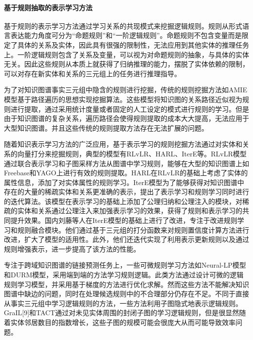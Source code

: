 \paragraph{基于规则抽取的表示学习方法}
基于规则的表示学习方法通过学习关系的共现模式来挖掘逻辑规则。规则从形式语言表达能力角度可分为“命题规则”和“一阶逻辑规则”\cite{2023-ed}。命题规则不包含变量而是限定了具体的关系及实体，因此具有很强的限制性，无法应用到其他实体的推理任务上。一阶逻辑规则包含了关系及变量，可以视为对命题规则的抽象，与具体的实体无关。因此这些规则从本质上就获得了归纳推理的能力，摆脱了实体依赖的限制，可以对存在新实体和关系的三元组上的任务进行推理指导。

为了对知识图谱事实三元组中隐含的规则进行挖掘，传统的规则挖掘方法如AMIE\cite{galarraga2013amie}模型基于路径遍历的思想实现挖掘算法。这些模型将知识图的关系路径近似视为规则进行提取，通过采用统计度量或者固定的人工设定的模式进行规则的学习。但是由于知识图谱的复杂关系，遍历路径会使得规则提取的成本大大提高，无法应用于大型知识图谱。并且这些传统的规则提取方法存在无法扩展的问题。

随着知识表示学习方法的广泛应用，基于表示学习的规则挖掘方法通过对实体和关系的向量打分来挖掘规则，典型的模型有RLvLR\cite{omran2018scalable}、HARL\cite{omran2022learning}、IterE\cite{zhang2019iteratively}等。RLvLR模型通过联合表示学习和子图采样方法从图谱中学习规则，能够在大型的知识图谱上如Freebase和YAGO上进行有效的规则提取。HARL在RLvLR的基础上考虑了实体的属性信息，添加了对实体属性的规则学习。IterE模型为了能够获得对知识图谱中存在的大量的稀疏实体和关系更准确的表示，提出了表示学习和规则学习同时进行的迭代算法。该模型在表示学习的基础上添加了公理归纳和公理注入的模块，对稀疏的实体和关系通过公理注入来加强表示学习的效果，获得了规则和表示学习的共同提升效果。国内刘藤\cite{2021-qx}等人在IterE模型的基础上进行了改进，专注于改进规则学习和规则融合模块。他们通过基于三元组的打分函数来对规则置信度计算方法进行改进，扩大了模型的适用性。此外，他们还迭代实现了利用表示更新规则以及通过规则增强表示，进一步提高了该方法的性能。

专注于跨域知识图谱的链接预测任务上，一些可微规则学习方法如Neural-LP\cite{yang2017differentiable}模型和DURM\cite{sadeghian2019drum}模型，采用端到端的方法学习规则逻辑。此类方法通过设计可微的逻辑规则学习模型，并采用基于梯度的方法进行优化求解。然而这些方法不能解决知识图谱中缺边的问题，同时在处理候选规则中的不合理部分仍存在不足。不同于直接从事实三元组中学习逻辑规则的方法，一些方法利用子图隐式地表示逻辑规则。GraIL[9]和TACT\cite{chen2021topology}通过对未见实体周围的封闭子图的学习逻辑规则，但是很显然随着实体邻居数目的指数增长，这些子图的规模可能会很庞大从而可能导致效率问题。

